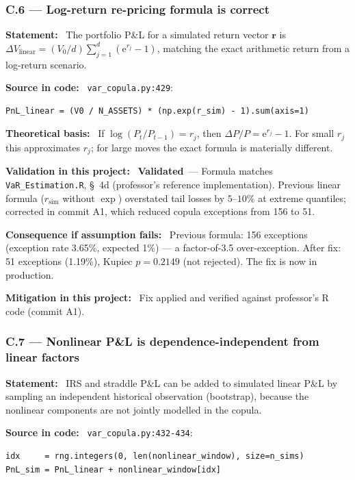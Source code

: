 \documentclass[11pt,a4paper]{article}
\newcommand{\asmfield}[1]{\medskip\noindent\textbf{#1:}\ }
\newcommand{\code}[1]{\texttt{#1}}
\newcommand{\validated}{\textbf{Validated}}
\begin{document}
\subsubsection{C.6 --- Log-return re-pricing formula is correct}\label{asm:C6}

\asmfield{Statement}
The portfolio P\&L for a simulated return vector $\mathbf{r}$ is
$\Delta V_{\text{linear}} = (V_0/d) \sum_{j=1}^{d}(\mathrm{e}^{r_j} - 1)$,
matching the exact arithmetic return from a log-return scenario.

\asmfield{Source in code}
\code{var\_copula.py:429}:
\begin{lstlisting}
PnL_linear = (V0 / N_ASSETS) * (np.exp(r_sim) - 1).sum(axis=1)
\end{lstlisting}

\asmfield{Theoretical basis}
If $\log(P_t/P_{t-1}) = r_j$, then $\Delta P / P = \mathrm{e}^{r_j} - 1$.
For small $r_j$ this approximates $r_j$; for large moves the exact formula
is materially different.

\asmfield{Validation in this project}
\validated\ --- Formula matches \code{VaR\_Estimation.R}, \S~4d (professor's
reference implementation). Previous linear formula ($r_{\text{sim}}$ without
$\exp$) overstated tail losses by $5$--$10\%$ at extreme quantiles;
corrected in commit A1, which reduced copula exceptions from 156 to 51.

\asmfield{Consequence if assumption fails}
Previous formula: 156 exceptions (exception rate 3.65\%, expected 1\%) ---
a factor-of-3.5 over-exception. After fix: 51 exceptions (1.19\%), Kupiec
$p = 0.2149$ (not rejected). The fix is now in production.

\asmfield{Mitigation in this project}
Fix applied and verified against professor's R code (commit A1).

\subsubsection{C.7 --- Nonlinear P\&L is dependence-independent from linear factors}\label{asm:C7}

\asmfield{Statement}
IRS and straddle P\&L can be added to simulated linear P\&L by sampling
an independent historical observation (bootstrap), because the nonlinear
components are not jointly modelled in the copula.

\asmfield{Source in code}
\code{var\_copula.py:432-434}:
\begin{lstlisting}
idx     = rng.integers(0, len(nonlinear_window), size=n_sims)
PnL_sim = PnL_linear + nonlinear_window[idx]
\end{lstlisting}
\end{document}
